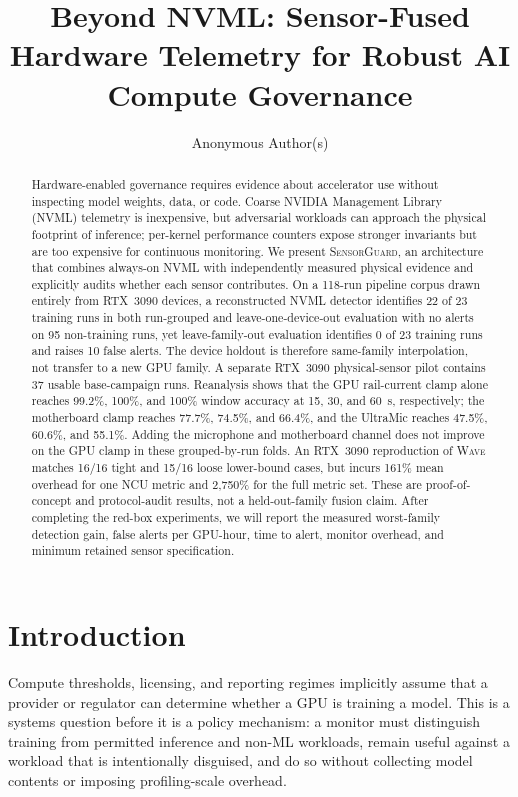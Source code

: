 \documentclass[sigplan,anonymous,review,nonacm]{acmart}
\title{Beyond NVML: Sensor-Fused Hardware Telemetry for Robust AI Compute Governance}
\author{Anonymous Author(s)}
\date{}
\newcommand{\wave}{\textsc{Wave}}
\newcommand{\system}{\textsc{SensorGuard}}
\begin{document}
\begin{abstract}
Hardware-enabled governance requires evidence about accelerator use without inspecting model weights, data, or code. Coarse NVIDIA Management Library (NVML) telemetry is inexpensive, but adversarial workloads can approach the physical footprint of inference; per-kernel performance counters expose stronger invariants but are too expensive for continuous monitoring. We present \system{}, an architecture that combines always-on NVML with independently measured physical evidence and explicitly audits whether each sensor contributes. On a 118-run pipeline corpus drawn entirely from RTX~3090 devices, a reconstructed NVML detector identifies 22 of 23 training runs in both run-grouped and leave-one-device-out evaluation with no alerts on 95 non-training runs, yet leave-family-out evaluation identifies 0 of 23 training runs and raises 10 false alerts. The device holdout is therefore same-family interpolation, not transfer to a new GPU family. A separate RTX~3090 physical-sensor pilot contains 37 usable base-campaign runs. Reanalysis shows that the GPU rail-current clamp alone reaches 99.2\%, 100\%, and 100\% window accuracy at 15, 30, and 60~s, respectively; the motherboard clamp reaches 77.7\%, 74.5\%, and 66.4\%, and the UltraMic reaches 47.5\%, 60.6\%, and 55.1\%. Adding the microphone and motherboard channel does not improve on the GPU clamp in these grouped-by-run folds. An RTX~3090 reproduction of \wave{} matches 16/16 tight and 15/16 loose lower-bound cases, but incurs 161\% mean overhead for one NCU metric and 2,750\% for the full metric set. These are proof-of-concept and protocol-audit results, not a held-out-family fusion claim. After completing the red-box experiments, we will report the measured worst-family detection gain, false alerts per GPU-hour, time to alert, monitor overhead, and minimum retained sensor specification.
\end{abstract}
\maketitle

\section{Introduction}

Compute thresholds, licensing, and reporting regimes implicitly assume that a provider or regulator can determine whether a GPU is training a model. This is a systems question before it is a policy mechanism: a monitor must distinguish training from permitted inference and non-ML workloads, remain useful against a workload that is intentionally disguised, and do so without collecting model contents or imposing profiling-scale overhead.
\end{document}
